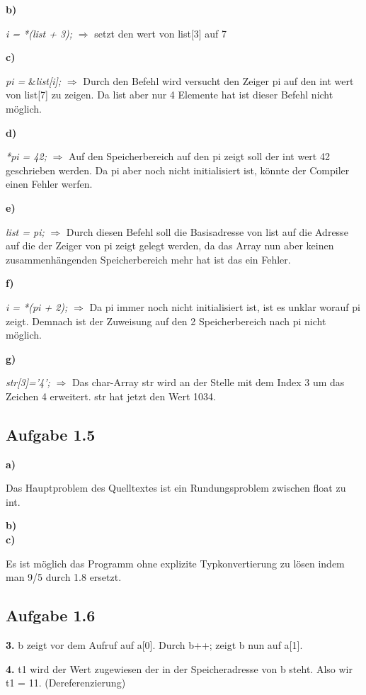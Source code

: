 \documentclass[a4paper,graphics,11pt]{article}
\newcommand{\aufgabe}[1]{\subsection*{Aufgabe #1}}
\begin{document}
\textbf{b)}

\textit{i = *(list + 3);} $\Longrightarrow$ setzt den wert von list[3] auf 7

\textbf{c)}

\textit{pi =  } \&\textit{list[i];} $\Longrightarrow$ Durch den Befehl wird versucht den Zeiger pi auf den int wert von list[7] zu zeigen. Da list aber nur 4 Elemente hat ist dieser Befehl nicht möglich.

\textbf{d)}

\textit{*pi = 42;} $\Longrightarrow$ Auf den Speicherbereich auf den pi zeigt soll der int wert 42 geschrieben werden. Da pi aber noch nicht initialisiert ist, könnte der Compiler einen Fehler werfen.

\textbf{e)}

\textit{list = pi;} $\Longrightarrow$ Durch diesen Befehl soll die Basisadresse von list auf die Adresse auf die der Zeiger von pi zeigt gelegt werden, da das Array nun aber keinen zusammenhängenden Speicherbereich mehr hat ist das ein Fehler.

\textbf{f)}

\textit{i = *(pi + 2);} $\Longrightarrow$ Da pi immer noch nicht initialisiert ist, ist es unklar worauf pi zeigt. Demnach ist der Zuweisung auf den 2 Speicherbereich nach pi nicht möglich.

\textbf{g)}

\textit{str[3]=’4’;} $\Longrightarrow$ Das char-Array str wird an der Stelle mit dem Index 3 um das Zeichen 4 erweitert. str hat jetzt den Wert 1034.

\newpage

\aufgabe{1.5}

\textbf{a)}

Das Hauptproblem des Quelltextes ist ein Rundungsproblem zwischen float zu int.

\textbf{b)}\\



\textbf{c)}

Es ist möglich das Programm ohne explizite Typkonvertierung zu lösen indem man 9/5 durch 1.8 ersetzt.

\aufgabe{1.6}

\textbf{3.} b zeigt vor dem Aufruf auf a[0]. Durch b++; zeigt b nun auf a[1].

\textbf{4.} t1 wird der Wert zugewiesen der in der Speicheradresse von b steht. Also wir t1 = 11. (Dereferenzierung)
\end{document}
